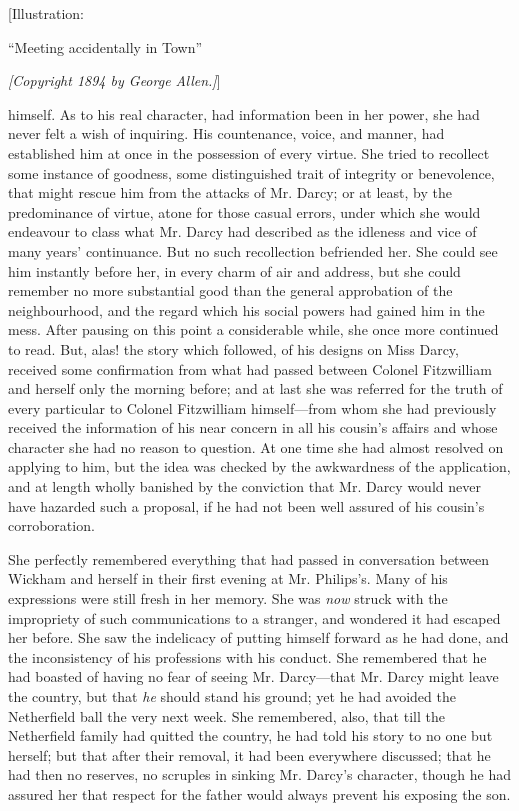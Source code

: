 \documentclass[12pt]{book}
\begin{document}
[Illustration:

``Meeting accidentally in Town''

\emph{[\textit{Copyright 1894 by George Allen.}]}]

himself. As to his real character, had information been in her power, she had never felt a wish of inquiring. His countenance, voice, and manner, had established him at once in the possession of every virtue. She tried to recollect some instance of goodness, some distinguished trait of integrity or benevolence, that might rescue him from the attacks of Mr. Darcy; or at least, by the predominance of virtue, atone for those casual errors, under which she would endeavour to class what Mr. Darcy had described as the idleness and vice of many years' continuance. But no such recollection befriended her. She could see him instantly before her, in every charm of air and address, but she could remember no more substantial good than the general approbation of the neighbourhood, and the regard which his social powers had gained him in the mess. After pausing on this point a considerable while, she once more continued to read. But, alas! the story which followed, of his designs on Miss Darcy, received some confirmation from what had passed between Colonel Fitzwilliam and herself only the morning before; and at last she was referred for the truth of every particular to Colonel Fitzwilliam himself---from whom she had previously received the information of his near concern in all his cousin's affairs and whose character she had no reason to question. At one time she had almost resolved on applying to him, but the idea was checked by the awkwardness of the application, and at length wholly banished by the conviction that Mr. Darcy would never have hazarded such a proposal, if he had not been well assured of his cousin's corroboration.

She perfectly remembered everything that had passed in conversation between Wickham and herself in their first evening at Mr. Philips's. Many of his expressions were still fresh in her memory. She was \textit{now} struck with the impropriety of such communications to a stranger, and wondered it had escaped her before. She saw the indelicacy of putting himself forward as he had done, and the inconsistency of his professions with his conduct. She remembered that he had boasted of having no fear of seeing Mr. Darcy---that Mr. Darcy might leave the country, but that \textit{he} should stand his ground; yet he had avoided the Netherfield ball the very next week. She remembered, also, that till the Netherfield family had quitted the country, he had told his story to no one but herself; but that after their removal, it had been everywhere discussed; that he had then no reserves, no scruples in sinking Mr. Darcy's character, though he had assured her that respect for the father would always prevent his exposing the son.
\end{document}
